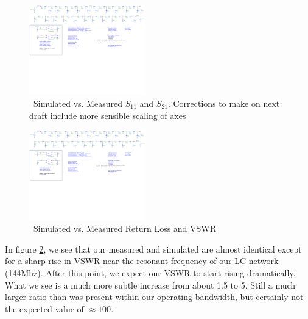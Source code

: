 \documentclass[journal]{IEEEtran} \usepackage[english]{babel}
\begin{document}
\begin{figure}[htb]
\centering
\includegraphics[width=0.45\textwidth,page = 2]{Fixed_ZeroBias_Sparam_Sims.pdf}
\caption{\ Simulated vs. Measured $S_{11}$ and $S_{21}$. Corrections to make on next draft include more sensible scaling of axes
}\label{fig:S11_S21}
\end{figure}



\begin{figure}[htb]
\centering
\includegraphics[width=0.45\textwidth,page = 3]{Fixed_ZeroBias_Sparam_Sims.pdf}
\caption{\ Simulated vs. Measured Return Loss and VSWR
}\label{fig:VSWRandReturnLoss}
\end{figure}

In figure \ref{fig:VSWRandReturnLoss}, we see that our measured and simulated
are almost identical except for a sharp rise in VSWR near the resonant frequency
of our LC network (144Mhz). After this point, we expect our VSWR to start rising
dramatically. What we see is a much more subtle increase from about 1.5 to 5.
Still a much larger ratio than was present within our operating bandwidth, but
certainly not the expected value of $\approx 100$.





\end{document}
